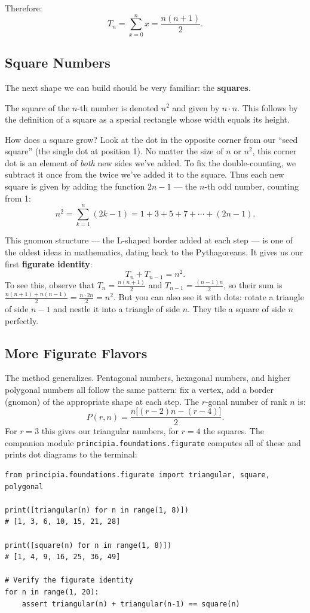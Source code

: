 Therefore:
\[
    T_n = \sum_{x=0}^{n} x = \frac{n(n+1)}{2}.
\]

\subsection{Square Numbers}

The next shape we can build should be very familiar: the \textbf{squares}.

The square of the $n$-th number is denoted $n^2$ and given by $n \cdot n$.
This follows by the definition of a square as a special rectangle whose width
equals its height.

How does a square grow? Look at the dot in the opposite corner from our ``seed
square'' (the single dot at position 1). No matter the size of $n$ or $n^2$,
this corner dot is an element of \emph{both} new sides we've added. To fix the
double-counting, we subtract it once from the twice we've added it to the
square. Thus each new square is given by adding the function $2n - 1$ --- the
$n$-th odd number, counting from 1:
\[
    n^2 = \sum_{k=1}^{n} (2k - 1) = 1 + 3 + 5 + 7 + \cdots + (2n-1).
\]

This gnomon structure --- the L-shaped border added at each step --- is one
of the oldest ideas in mathematics, dating back to the Pythagoreans. It gives
us our first \textbf{figurate identity}:
\[
    T_n + T_{n-1} = n^2.
\]
To see this, observe that $T_n = \frac{n(n+1)}{2}$ and $T_{n-1} =
\frac{(n-1)n}{2}$, so their sum is $\frac{n(n+1) + n(n-1)}{2} = \frac{n \cdot
2n}{2} = n^2$. But you can also see it with dots: rotate a triangle of side
$n-1$ and nestle it into a triangle of side $n$. They tile a square of side
$n$ perfectly.

\subsection{More Figurate Flavors}

The method generalizes. Pentagonal numbers, hexagonal numbers, and higher
polygonal numbers all follow the same pattern: fix a vertex, add a border
(gnomon) of the appropriate shape at each step. The $r$-gonal number of rank
$n$ is:
\[
    P(r, n) = \frac{n\bigl[(r-2)n - (r-4)\bigr]}{2}.
\]
For $r = 3$ this gives our triangular numbers, for $r = 4$ the squares.
The companion module \texttt{principia.foundations.figurate} computes all of
these and prints dot diagrams to the terminal:

\begin{verbatim}
from principia.foundations.figurate import triangular, square, polygonal

print([triangular(n) for n in range(1, 8)])
# [1, 3, 6, 10, 15, 21, 28]

print([square(n) for n in range(1, 8)])
# [1, 4, 9, 16, 25, 36, 49]

# Verify the figurate identity
for n in range(1, 20):
    assert triangular(n) + triangular(n-1) == square(n)
\end{verbatim}



